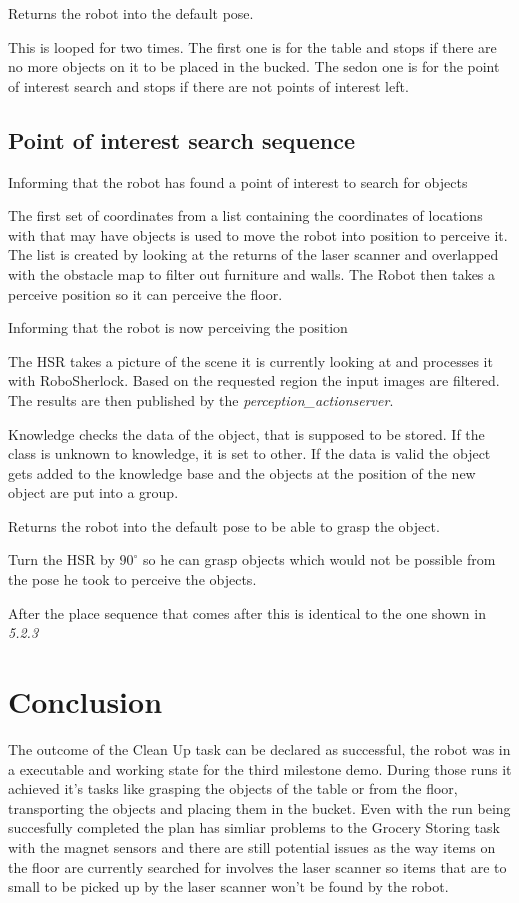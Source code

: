 \documentclass[main.tex]{subfiles}
\begin{document}
	Returns the robot into the default pose.
	
	This is looped for two times.
	The first one is for the table and stops if there are no more objects on it to be placed in the bucked. The sedon one is for the point of interest search and stops if there are not points of interest left.
	
	\subsection{Point of interest search sequence}
    Informing that the robot has found a point of interest to search for objects
    
    The first set of coordinates from a list containing the coordinates of locations with that may have objects is used to move the robot into position to perceive it. 
    The list is created by looking at the returns of the laser scanner and overlapped with the obstacle map to filter out furniture and walls. 
    The Robot then takes a perceive position so it can perceive the floor.
    
    Informing that the robot is now perceiving the position
      
	The HSR takes a picture of the scene it is currently looking at and processes it with RoboSherlock. Based on the requested region the input images are filtered. The results are then published by the \textit{perception\_actionserver}.

    
    Knowledge checks the data of the object, that is supposed to be stored. If the class is unknown to knowledge, it is set to other. If the data is valid the object gets added to the knowledge base and the objects at the position of the new object are put into a group.
    
   	Returns the robot into the default pose to be able to grasp the object.

    Turn the HSR by $90^\circ$ so he can grasp objects which would not be possible from     the pose he took to perceive the objects.

    After the place sequence that comes after this is identical to the one shown in \emph{5.2.3}
	\section{Conclusion}
	The outcome of the Clean Up task can be declared as successful, the robot was in a executable and working state for the third milestone demo. During those runs it achieved it's tasks like grasping the objects of the table or from the floor, transporting the objects and placing them in the bucket.
	Even with the run being succesfully completed the plan has simliar problems to the Grocery Storing task with the magnet sensors and there are still potential issues as the way items on the floor are currently searched for involves the laser scanner so items that are to small to be picked up by the laser scanner won't be found by the robot.
	\endgroup
\end{document}
